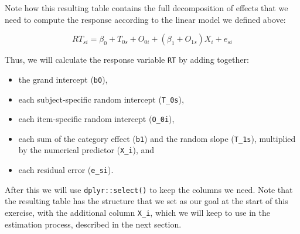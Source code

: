 \documentclass[english,doc,floatsintext]{apa6}
\newenvironment{Shaded}{\begin{snugshade}}{\end{snugshade}}
\newcommand{\CommentTok}[1]{\textcolor[rgb]{0.56,0.35,0.01}{\textit{#1}}}
\newcommand{\DataTypeTok}[1]{\textcolor[rgb]{0.13,0.29,0.53}{#1}}
\newcommand{\KeywordTok}[1]{\textcolor[rgb]{0.13,0.29,0.53}{\textbf{#1}}}
\newcommand{\NormalTok}[1]{#1}
\newcommand{\OperatorTok}[1]{\textcolor[rgb]{0.81,0.36,0.00}{\textbf{#1}}}
\newcommand{\StringTok}[1]{\textcolor[rgb]{0.31,0.60,0.02}{#1}}
\providecommand{\tightlist}{%
  \setlength{\itemsep}{0pt}\setlength{\parskip}{0pt}}
\begin{document}
Note how this resulting table contains the full decomposition of effects that we need to compute the response according to the linear model we defined above:

\begin{equation}
RT_{si} = \beta_0 + T_{0s} + O_{0i} + \left(\beta_1 + O_{1s}\right) X_i + e_{si}
\end{equation}

Thus, we will calculate the response variable \texttt{RT} by adding together:

\begin{itemize}
\tightlist
\item
  the grand intercept (\texttt{b0}),
\item
  each subject-specific random intercept (\texttt{T\_0s}),
\item
  each item-specific random intercept (\texttt{O\_0i}),
\item
  each sum of the category effect (\texttt{b1}) and the random slope (\texttt{T\_1s}), multiplied by the numerical predictor (\texttt{X\_i}), and
\item
  each residual error (\texttt{e\_si}).
\end{itemize}

After this we will use \texttt{dplyr::select()} to keep the columns we need. Note that the resulting table has the structure that we set as our goal at the start of this exercise, with the additional column \texttt{X\_i}, which we will keep to use in the estimation process, described in the next section.

\begin{Shaded}
\end{Shaded}
\end{document}
